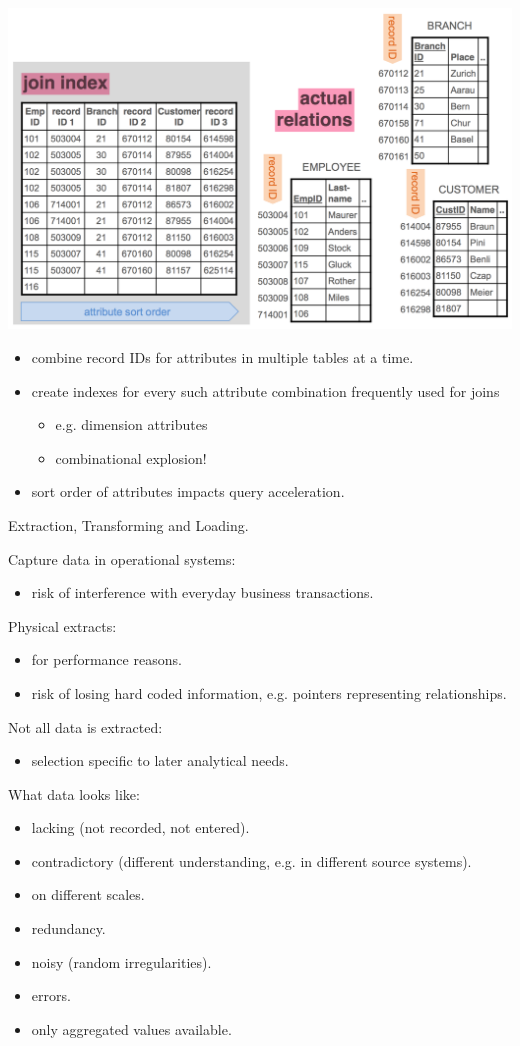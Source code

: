 \begin{breakbox}
\begin{center}
\includegraphics[width=.15\textwidth]{slides_images/join_indexes}
\end{center}
\begin{itemize}
	\item combine record IDs for attributes in multiple tables at a time.
	\item create indexes for every such attribute combination frequently used for joins
	\begin{itemize}
		\item e.g. dimension attributes
		\item combinational explosion!
	\end{itemize}
	\item sort order of attributes impacts query acceleration.
\end{itemize}
\end{breakbox}

\begin{breakbox}
\newline \textcolor{Emerald}{E}xtraction, \textcolor{Emerald}{T}ransforming and \textcolor{Emerald}{L}oading.
\end{breakbox}

\begin{breakbox}
\newline Capture data in operational systems:
\begin{itemize}
	\item risk of interference with everyday business transactions.
\end{itemize}
Physical extracts:
\begin{itemize}
	\item for performance reasons.
	\item risk of losing hard coded information, e.g. pointers representing relationships.
\end{itemize}
Not all data is extracted:
\begin{itemize}
	\item selection specific to later analytical needs.
\end{itemize}
What data looks like:
\begin{itemize}
	\item lacking (not recorded, not entered).
	\item contradictory (different understanding, e.g.
in different source systems).
	\item on different scales.
	\item redundancy.
	\item noisy (random irregularities).
	\item errors.
	\item only aggregated values available.
\end{itemize}
\end{breakbox}

